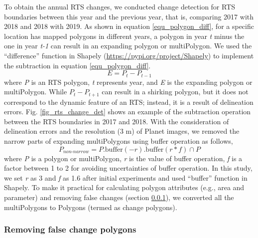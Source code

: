 \documentclass[authoryear,preprint,review,12pt]{elsarticle}
\begin{document}
To obtain the annual RTS changes, we conducted change detection for RTS boundaries between this year and the previous year, that is, comparing 2017 with 2018 and 2018 with 2019. 
 As shown in equation \ref{equ_polygon_diff}, for a specific location has mapped polygons in different years, a polygon in year \emph{t} minus the one in year \emph{t-1} can result in an expanding polygon or multiPolygon. 
We used the ``difference'' function in Shapely (\url{https://pypi.org/project/Shapely}) to implement the subtraction in equation \ref{equ_polygon_diff}.
\begin{equation}
E= P_{t} - P_{t-1}
\label{equ_polygon_diff}
\end{equation}
where \emph{P} is an RTS polygon, \emph{t} represents year, and \emph{E} is the expanding polygon or multiPolygon. 
While $P_{t} - P_{t+1}$ can result in a shirking polygon, but it does not correspond to the dynamic feature of an RTS; instead, it is a result of delineation errors. 
Fig. \ref{fig_rts_change_det} shows an example of the subtraction operation between the RTS boundaries in 2017 and 2018. 
With the consideration of delineation errors and the resolution (3 m) of Planet images, we removed the narrow parts of expanding multiPolygons using buffer operation as follows, 
\begin{equation}
P_{non\text{-}narrow}= P.\text{buffer}(-r).\text{buffer}(r*f) \cap P
\label{equ_polygon_buffer}
\end{equation}
where \emph{P} is a polygon or multiPolygon, \emph{r} is the value of buffer operation,  \emph{f} is a factor between 1 to 2 for avoiding uncertainties of buffer operation. 
In this study, we set \emph{r} as 3 and \emph{f} as 1.6 after initial experiments and used ``buffer'' function in Shapely.
To make it practical for calculating polygon attributes (e.g., area and parameter) and removing false changes (section \ref{sec_removing_false_change}), we converted all the multiPolygons to Polygons (termed as change polygons).




\subsubsection{Removing false change polygons}
\label{sec_removing_false_change}
\end{document}

